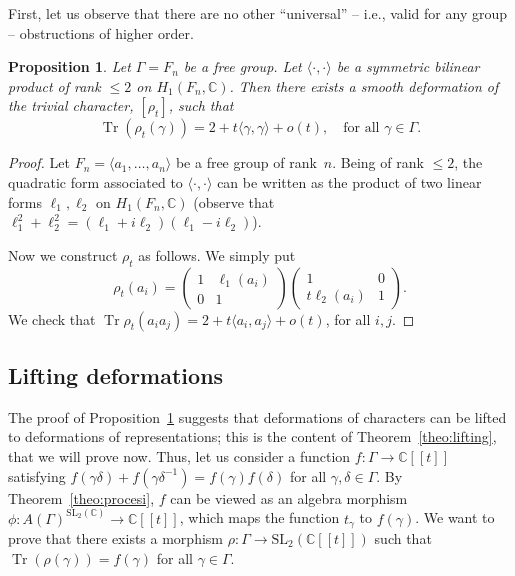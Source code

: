 \documentclass[11pt]{article}
\newcommand{\ie}{i.e.,\xspace}
\newcommand{\lbr}{[\![}
\newcommand{\rbr}{]\!]}
\newtheorem{proposition}[theorem]{Proposition}
\theoremstyle{definition}
\newcommand{\CC}{\mathbb{C}}
\newcommand{\tr}{\operatorname{Tr}}
\newcommand{\SL}{\mathrm{SL}}
\begin{document}
First, let us observe that there are no other ``universal'' -- \ie valid
for any group -- obstructions of higher order.
\begin{proposition}\label{prop:PasPlusQueTrois}
Let $\Gamma=F_n$ be a free group. Let $\langle\cdot,\cdot\rangle$ be a
symmetric bilinear product of rank $\leq 2$ on $H_1(F_n,\CC)$.
Then there exists a smooth deformation
of the trivial character, $[\rho_t]$, such that
\[ \tr(\rho_t(\gamma))=2+t\langle\gamma,\gamma\rangle+
o(t), \quad\text{for all }\gamma\in\Gamma. \]
\end{proposition}

\begin{proof}
Let $F_n=\langle a_1,\ldots,a_n\rangle$ be a free group of rank~$n$.
Being of rank $\leq 2$, the quadratic form associated to
$\langle\cdot,\cdot\rangle$
can be written as the product of two linear forms $\ell_1,\ell_2$ on
$H_1(F_n,\CC)$
(observe that $\ell_1^2+\ell_2^2=(\ell_1+i\ell_2)(\ell_1-i\ell_2)$).

Now we construct $\rho_t$ as follows. We simply put
\[ \rho_t(a_i)=\left(\begin{array}{cc}1 & \ell_1(a_i) \\ 0 & 1 \end{array}
\right)\left(\begin{array}{cc}1 & 0 \\ t\ell_2(a_i) & 1\end{array}\right).\]
We check that $\tr\rho_t(a_ia_j)=2+t\langle a_i,a_j\rangle+o(t)$,
for all $i,j$.
\end{proof}

\subsection{Lifting deformations}\label{sec:lifting}

The proof of Proposition~\ref{prop:PasPlusQueTrois} suggests that
deformations of characters can be lifted to deformations of representations;
this is the content of Theorem~\ref{theo:lifting}, that we will prove now.
Thus, let us consider a function $f\colon\Gamma\to\CC\lbr t\rbr$ satisfying
$f(\gamma\delta)+f(\gamma\delta^{-1})=f(\gamma)f(\delta)$ for all
$\gamma,\delta\in\Gamma$. By Theorem~\ref{theo:procesi},
$f$ can be viewed as an algebra morphism
$\phi\colon A(\Gamma)^{\SL_2(\CC)}\to\CC\lbr t\rbr$, which maps the function
$t_\gamma$ to $f(\gamma)$. We want to prove that there exists a morphism
$\rho\colon\Gamma\to\SL_2(\CC\lbr t\rbr)$ such that $\tr(\rho(\gamma))=f(\gamma)$
for all $\gamma\in\Gamma$.
\end{document}
